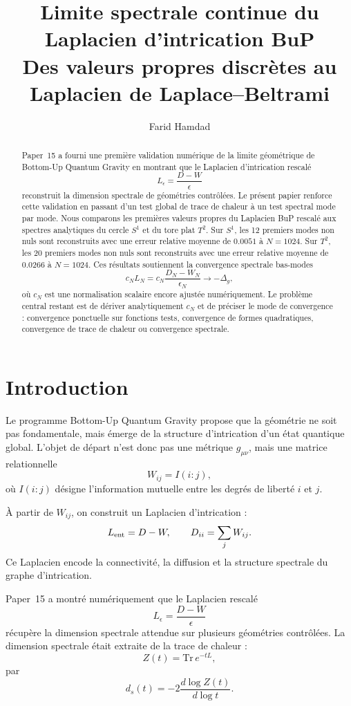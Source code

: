 \documentclass[11pt,a4paper]{article}
\title{
\textbf{Limite spectrale continue du Laplacien d'intrication BuP}\\
\large Des valeurs propres discrètes au Laplacien de Laplace--Beltrami
}
\author{Farid Hamdad}
\date{\2026}
\begin{document}
\maketitle

\begin{abstract}
Paper~15 a fourni une première validation numérique de la limite géométrique
de Bottom-Up Quantum Gravity en montrant que le Laplacien d'intrication
rescalé
\[
L_\epsilon=\frac{D-W}{\epsilon}
\]
reconstruit la dimension spectrale de géométries contrôlées. Le présent papier
renforce cette validation en passant d'un test global de trace de chaleur à
un test spectral mode par mode. Nous comparons les premières valeurs propres
du Laplacien BuP rescalé aux spectres analytiques du cercle \(S^1\) et du tore
plat \(T^2\). Sur \(S^1\), les 12 premiers modes non nuls sont reconstruits
avec une erreur relative moyenne de \(0.0051\) à \(N=1024\). Sur \(T^2\), les
20 premiers modes non nuls sont reconstruits avec une erreur relative moyenne
de \(0.0266\) à \(N=1024\). Ces résultats soutiennent la convergence
spectrale bas-modes
\[
c_N L_N
=
c_N\frac{D_N-W_N}{\epsilon_N}
\longrightarrow
-\Delta_g,
\]
où \(c_N\) est une normalisation scalaire encore ajustée numériquement. Le
problème central restant est de dériver analytiquement \(c_N\) et de préciser
le mode de convergence : convergence ponctuelle sur fonctions tests,
convergence de formes quadratiques, convergence de trace de chaleur ou
convergence spectrale.
\end{abstract}

\tableofcontents

\section{Introduction}

Le programme Bottom-Up Quantum Gravity propose que la géométrie ne soit pas
fondamentale, mais émerge de la structure d'intrication d'un état quantique
global. L'objet de départ n'est donc pas une métrique \(g_{\mu\nu}\), mais une
matrice relationnelle
\[
W_{ij}=I(i:j),
\]
où \(I(i:j)\) désigne l'information mutuelle entre les degrés de liberté
\(i\) et \(j\).

À partir de \(W_{ij}\), on construit un Laplacien d'intrication :
\[
L_{\rm ent}=D-W,
\qquad
D_{ii}=\sum_j W_{ij}.
\]
Ce Laplacien encode la connectivité, la diffusion et la structure spectrale du
graphe d'intrication.

Paper~15 a montré numériquement que le Laplacien rescalé
\[
L_\epsilon=\frac{D-W}{\epsilon}
\]
récupère la dimension spectrale attendue sur plusieurs géométries contrôlées.
La dimension spectrale était extraite de la trace de chaleur :
\[
Z(t)=\mathrm{Tr}\,e^{-tL},
\]
par
\[
d_s(t)
=
-2\frac{d\log Z(t)}{d\log t}.
\]
\end{document}
